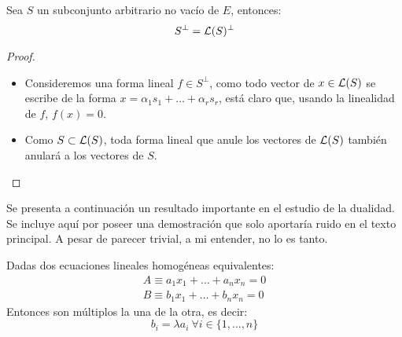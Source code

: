 \begin{lem}
	\label{A1_lem_anuladorBase} Sea $S$ un subconjunto arbitrario no vacío de $E$, entonces:
	\[S^{\perp}=\mathcal{L}(S)^{\perp}\]
\end{lem}\begin{proof}
\begin{itemize}
	\item[\bsubset] Consideremos una forma lineal $f\in S^{\perp}$, como todo vector de $x\in\mathcal{L}(S)$ se escribe de la forma $x=\alpha_1s_1+\dots+\alpha_rs_r$, está claro que, usando la linealidad de $f$, $f(x)=0$.
	\item[\bsetsub] Como $S\subset\mathcal{L}(S)$, toda forma lineal que anule los vectores de $\mathcal{L}(S)$ también anulará a los vectores de $S$.
\end{itemize}
\end{proof}
Se presenta a continuación un resultado importante en el estudio de la dualidad. Se incluye aquí por poseer una demostración que solo aportaría ruido en el texto principal. A pesar de parecer trivial, a mi entender, no lo es tanto.
\begin{prop}
	\label{A1_prop_criterioEquivalencia}
	Dadas dos ecuaciones lineales homogéneas equivalentes:
	\begin{gather*}
		A\equiv a_1x_1+\dots+a_nx_n=0\\
		B\equiv b_1x_1+\dots+b_nx_n=0
	\end{gather*}
	Entonces son múltiplos la una de la otra, es decir:
	\[b_i=\lambda a_i\ \forall i\in\{1,\dots,n\}\]
\end{prop}
